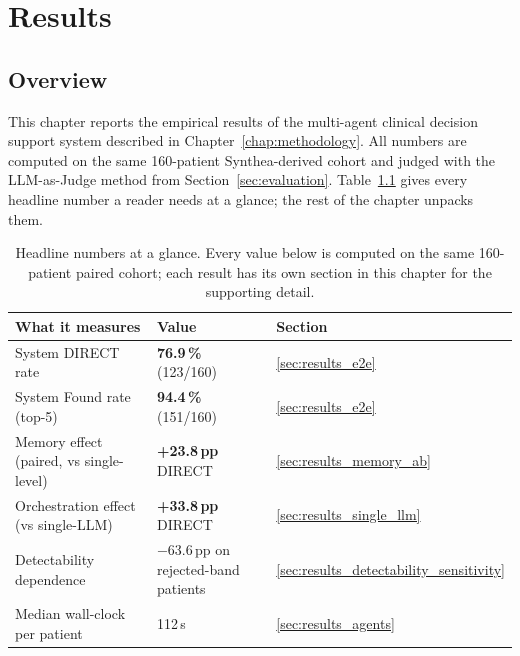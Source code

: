 \chapter{Results}
\label{chap:results}

\section{Overview}
\label{sec:results_overview}

This chapter reports the empirical results of the multi-agent clinical
decision support system described in Chapter~\ref{chap:methodology}. All
numbers are computed on the same 160-patient Synthea-derived cohort and
judged with the LLM-as-Judge method from Section~\ref{sec:evaluation}.
Table~\ref{tab:results_headline_summary} gives every headline number a
reader needs at a glance; the rest of the chapter unpacks them.

\begin{table}[!htbp]
\centering
\caption{Headline numbers at a glance. Every value below is computed on
the same 160-patient paired cohort; each result has its own section in
this chapter for the supporting detail.}
\label{tab:results_headline_summary}
\small
\begin{tabular}{@{}lll@{}}
\toprule
\textbf{What it measures}                & \textbf{Value}                       & \textbf{Section} \\
\midrule
System DIRECT rate                       & \textbf{76.9\,\%} (123/160)          & \ref{sec:results_e2e}            \\
System Found rate (top-5)                & \textbf{94.4\,\%} (151/160)          & \ref{sec:results_e2e}            \\
Memory effect (paired, vs single-level)  & \textbf{+23.8\,pp} DIRECT            & \ref{sec:results_memory_ab}      \\
Orchestration effect (vs single-LLM)     & \textbf{+33.8\,pp} DIRECT            & \ref{sec:results_single_llm}     \\
Detectability dependence                 & $-63.6\,$pp on rejected-band patients & \ref{sec:results_detectability_sensitivity} \\
Median wall-clock per patient            & 112\,s                                & \ref{sec:results_agents}         \\
\bottomrule
\end{tabular}
\end{table}

